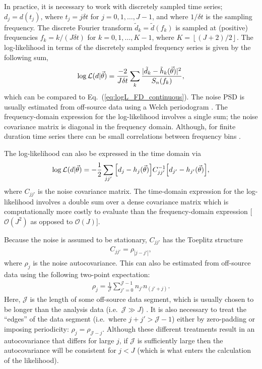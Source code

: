In practice, it is necessary to work with discretely sampled time series; $d_j = d(t_j)$, where $t_j=j\delta t$ for $j=0,1,\ldots, J-1$, and where $1/\delta t$ is the sampling frequency.
The discrete Fourier transform $\tilde{d}_k = \tilde{d}(f_k)$ is sampled at (positive) frequencies $f_k=k/(J\delta t)$ for $k=0,1,\ldots,K-1$, where $K=\left \lfloor (J+2)/2\right \rfloor$.
The log-likelihood in terms of the discretely sampled frequency series is given by the following sum,
\begin{align} \label{eq:logL_FD_discrete}
	\log\mathcal{L}(d|\vec{\theta}) = \frac{-2}{J\delta t}\sum_{k}\frac{|\tilde{d}_k-\tilde{h}_k(\vec{\theta})|^2}{S_n(f_k)},
\end{align}
which can be compared to Eq.~(\ref{eq:logL_FD_continuous}).
The noise PSD is usually estimated from off-source data using a Welch periodogram \cite{1161901}.
The frequency-domain expression for the log-likelihood involves a single sum; the noise covariance matrix is diagonal in the frequency domain.
Although, for finite duration time series there can be small correlations between frequency bins \cite{Talbot:2021igi}.

The log-likelihood can also be expressed in the time domain via
\begin{align} \label{eq:logL_TD_discrete}
	\log\mathcal{L}(d|\vec{\theta}) = -\frac{1}{2}\sum_{jj'}\qty[d_j-h_j(\vec{\theta})] C^{-1}_{jj'} \qty[d_{j'}-h_{j'}(\vec{\theta})],
\end{align}
where $C_{jj'}$ is the noise covariance matrix.
The time-domain expression for the log-likelihood involves a double sum over a dense covariance matrix which is computationally more costly to evaluate than the frequency-domain expression [$\mathcal{O}(J^2)$ as opposed to $\mathcal{O}(J)$].

Because the noise is assumed to be stationary, $C_{jj'}$ has the Toeplitz structure
\begin{align} \label{eq:Toeplitz}
	C_{jj'} = \rho_{|j-j'|},
\end{align} 
where $\rho_j$ is the noise autocovariance. 
This can also be estimated from off-source data using the following two-point expectation:
\begin{align} \label{eq:autocovariance}
	\rho_j = \frac{1}{\mathcal{J}}\sum_{j'=0}^{\mathcal{J}-1}n_{j'}n_{(j'+j)}.
\end{align}
Here, $\mathcal{J}$ is the length of some off-source data segment, which is usually chosen to be longer than the analysis data (i.e.\ $\mathcal{J} \gg J$) \cite{Isi:2021iql}.
It is also necessary to treat the ``edges'' of the data segment (i.e.\ where $j + j' > \mathcal{J}-1$) either by zero-padding or imposing periodicity: $\rho_j = \rho_{\mathcal{J}-j}$.
Although these different treatments result in an autocovariance that differs for large $j$, if $\mathcal{J}$ is sufficiently large then the autocovariance will be consistent for $j < J$ (which is what enters the calculation of the likelihood).

